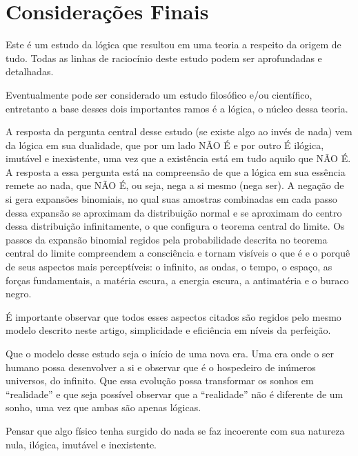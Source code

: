 \section*{Considerações Finais}
Este é um estudo da lógica que resultou em uma teoria a respeito da origem de tudo. Todas as linhas de raciocínio deste estudo podem ser aprofundadas e detalhadas. 

Eventualmente pode ser considerado um estudo filosófico e/ou científico, entretanto a base desses dois importantes ramos é a lógica, o núcleo dessa teoria. 

A resposta da pergunta central desse estudo (se existe algo ao invés de nada) vem da lógica em sua dualidade, que por um lado NÃO É e por outro É ilógica, imutável e inexistente, uma vez que a existência está em tudo aquilo que NÃO É. A resposta a essa pergunta está na compreensão de que a lógica em sua essência remete ao nada, que NÃO É, ou seja, nega a si mesmo (nega ser). A negação de si gera expansões binomiais, no qual suas amostras combinadas em cada passo dessa expansão se aproximam da distribuição normal e se aproximam do centro dessa distribuição infinitamente, o que configura o teorema central do limite. Os passos da expansão binomial regidos pela probabilidade descrita no teorema central do limite compreendem a consciência e tornam visíveis o que é e o porquê de seus aspectos mais perceptíveis: o infinito, as ondas, o tempo, o espaço, as forças fundamentais, a matéria escura, a energia escura, a antimatéria e o buraco negro.

É importante observar que todos esses aspectos citados são regidos pelo mesmo modelo descrito neste artigo, simplicidade e eficiência em níveis da perfeição.

Que o modelo desse estudo seja o início de uma nova era. Uma era onde o ser humano possa desenvolver a si e observar que é o hospedeiro de inúmeros universos, do infinito. Que essa evolução possa transformar os sonhos em “realidade” e que seja possível observar que a “realidade” não é diferente de um sonho, uma vez que ambas são apenas lógicas.

Pensar que algo físico tenha surgido do nada se faz incoerente com sua natureza nula, ilógica, imutável e inexistente.